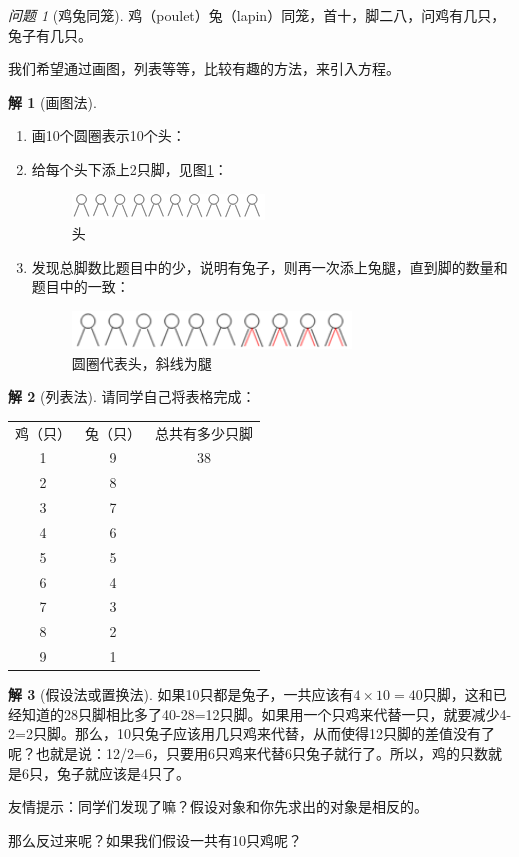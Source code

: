\documentclass{article}
\theoremstyle{definition}
\newtheorem{jie}{解}
\theoremstyle{remark}
\theoremstyle{theorem}
\newtheorem{ques}{问题}
\begin{document}
\begin{ques}[鸡兔同笼]
    鸡（poulet）兔（lapin）同笼，首十，脚二八，问鸡有几只，兔子有几只。
\end{ques}
我们希望通过画图，列表等等，比较有趣的方法，来引入方程。
\begin{jie}[画图法]
\begin{enumerate}
    \item 画10个圆圈表示10个头：
    \item 给每个头下添上2只脚，见图\ref{fig:head-foot}：
    \begin{figure}
        \centering
        \includegraphics{head-foot.png}
        \caption{头}
        \label{fig:head-foot}
    \end{figure}
    \item 发现总脚数比题目中的少，说明有兔子，则再一次添上兔腿，直到脚的数量和题目中的一致：
    \begin{figure}[H] %
\centering %
\includegraphics[width=0.7\textwidth]{jitu.png} %
\caption{圆圈代表头，斜线为腿} %
\label{jitu} %
\end{figure}
\end{enumerate}
\end{jie}
\begin{jie}[列表法]
请同学自己将表格完成：
\begin{center}
    \begin{tabular}{c|c|c}
    鸡（只） & 兔（只）& 总共有多少只脚 \\
    1 & 9 & 38\\
    2 & 8 & \\
    3 & 7 & \\
    4& 6 & \\
    5 & 5 & \\
    6 & 4 & \\
    7 & 3 & \\
    8 & 2 & \\
    9 & 1 & 
\end{tabular}
\end{center}
\end{jie}
\begin{jie}[假设法或置换法]

如果10只都是兔子，一共应该有$4\times 10=40$只脚，这和已经知道的28只脚相比多了40-28=12只脚。如果用一个只鸡来代替一只，就要减少4-2=2只脚。那么，10只兔子应该用几只鸡来代替，从而使得12只脚的差值没有了呢？也就是说：12/2=6，只要用6只鸡来代替6只兔子就行了。所以，鸡的只数就是6只，兔子就应该是4只了。

友情提示：同学们发现了嘛？假设对象和你先求出的对象是相反的。

那么反过来呢？如果我们假设一共有10只鸡呢？

\end{jie}
\end{document}
